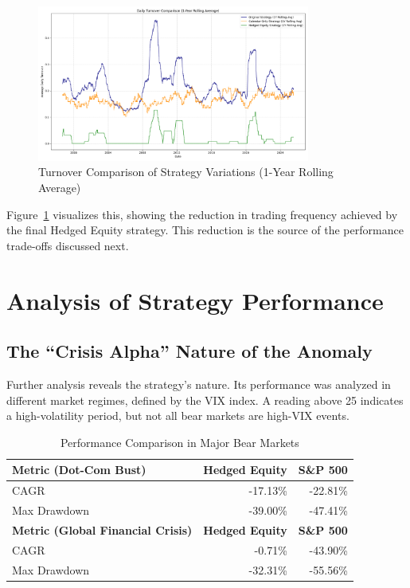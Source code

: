 \documentclass{article}
\begin{document}
\begin{figure}[htbp]
    \centering
    \includegraphics[width=0.8\textwidth]{plot_turnover_analysis.png}
    \caption{Turnover Comparison of Strategy Variations (1-Year Rolling Average)}
    \label{fig:turnover_analysis}
\end{figure}

Figure~\ref{fig:turnover_analysis} visualizes this, showing the reduction in trading frequency achieved by the final Hedged Equity strategy. This reduction is the source of the performance trade-offs discussed next.

\vspace{1em}
\hrulefill

\section{Analysis of Strategy Performance}

\subsection{The ``Crisis Alpha'' Nature of the Anomaly}
Further analysis reveals the strategy's nature. Its performance was analyzed in different market regimes, defined by the VIX index. A reading above 25 indicates a high-volatility period, but not all bear markets are high-VIX events.

\begin{table}[htbp]
\centering
\caption{Performance Comparison in Major Bear Markets}
\begin{tabular}{lrr}
\toprule
\textbf{Metric (Dot-Com Bust)} & \textbf{Hedged Equity} & \textbf{S\&P 500} \\
\midrule
CAGR           & -17.13\% & -22.81\% \\
Max Drawdown   & -39.00\% & -47.41\% \\
\midrule
\textbf{Metric (Global Financial Crisis)} & \textbf{Hedged Equity} & \textbf{S\&P 500} \\
\midrule
CAGR           & -0.71\% & -43.90\% \\
Max Drawdown   & -32.31\% & -55.56\% \\
\bottomrule
\end{tabular}
\end{table}
\end{document}
